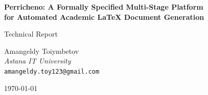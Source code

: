 \documentclass[12pt, a4paper]{article}
\begin{document}
\begin{titlepage}
  \centering
  \vspace*{2cm}
  {\LARGE\bfseries\color{C1}
    Perricheno: A Formally Specified Multi-Stage Platform\\[0.4em]
    for Automated Academic \LaTeX{} Document Generation\par}
  \vspace{1.5em}
  {\large Technical Report\par}
  \vspace{2em}
  {\large
    Amangeldy Toiymbetov\\[0.3em]
    \textit{Astana IT University}\\[0.2em]
    \texttt{amangeldy.toy123@gmail.com}\par}
  \vspace{2em}
  {\large\today\par}
  \vfill
  \begin{abstract}
    
  \end{abstract}
\end{titlepage}

\tableofcontents
\newpage


\newpage

\newpage

\newpage

\newpage

\newpage

\newpage

\newpage


\newpage
\printbibliography[heading=bibintoc, title={References}]
\end{document}
